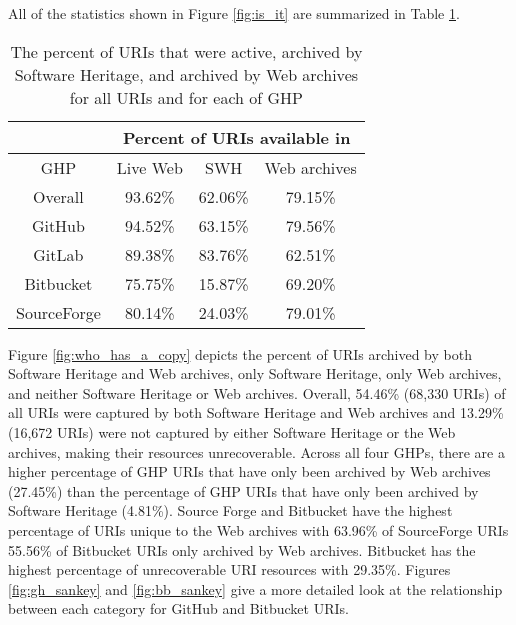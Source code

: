 All of the statistics shown in Figure \ref{fig:is_it} are summarized in Table \ref{tab:stats}.

\begin{table}
\centering
\begin{tabular}{|c|c|c|c|}
\hline
            & \multicolumn{3}{c|}{Percent of URIs available in} \\ \hline
GHP         & Live Web      & SWH          & Web archives      \\ \hline
Overall     & 93.62\%       & 62.06\%      & 79.15\%           \\ 
GitHub      & 94.52\%       & 63.15\%      & 79.56\%           \\ 
GitLab      & 89.38\%       & 83.76\%      & 62.51\%           \\ 
Bitbucket   & 75.75\%       & 15.87\%      & 69.20\%           \\ 
SourceForge & 80.14\%       & 24.03\%      & 79.01\%           \\
\hline     
    \end{tabular}
    \caption{The percent of URIs that were active, archived by Software Heritage, and archived by Web archives for all URIs and for each of GHP}
    \label{tab:stats}
\end{table}

Figure \ref{fig:who_has_a_copy} depicts the percent of URIs archived by both Software Heritage and Web archives, only Software Heritage, only Web archives, and neither Software Heritage or Web archives. Overall, 54.46\% (68,330 URIs) of all URIs were captured by both Software Heritage and Web archives and 13.29\% (16,672 URIs) were not captured by either Software Heritage or the Web archives, making their resources unrecoverable. Across all four GHPs, there are a higher percentage of GHP URIs that have only been archived by Web archives (27.45\%) than the percentage of GHP URIs that have only been archived by Software Heritage (4.81\%). Source Forge and Bitbucket have the highest percentage of URIs unique to the Web archives with 63.96\% of SourceForge URIs 55.56\% of Bitbucket URIs only archived by Web archives. Bitbucket has the highest percentage of unrecoverable URI resources with 29.35\%. Figures \ref{fig:gh_sankey} and \ref{fig:bb_sankey} give a more detailed look at the relationship between each category for GitHub and Bitbucket URIs.  

